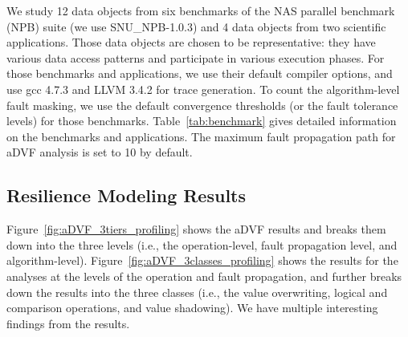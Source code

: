 We study 12 data objects from six benchmarks of the NAS parallel benchmark (NPB) suite (we use SNU\_NPB-1.0.3) and 4 data objects from two scientific applications. 
Those data objects are chosen to be representative: they have various data access patterns and participate in various execution phases.  
For those benchmarks and applications, we use their default compiler options, and use gcc 4.7.3 and LLVM 3.4.2 for trace generation.
To count the algorithm-level fault masking, we use the default convergence thresholds (or the fault tolerance levels) for those benchmarks.
Table~\ref{tab:benchmark} gives 
detailed information on the benchmarks and applications.
The maximum fault propagation path for aDVF analysis is set to 10 by default.

\subsection{Resilience Modeling Results}
Figure~\ref{fig:aDVF_3tiers_profiling}
shows the aDVF results and breaks them down into the three levels 
(i.e., the operation-level, fault propagation level, and algorithm-level).
Figure~\ref{fig:aDVF_3classes_profiling} shows the 
results for the analyses at the levels of the operation and fault propagation,
and further breaks down the results into 
the three classes (i.e., the value overwriting, logical and comparison operations,
and value shadowing). %
We have multiple interesting findings from the results.

